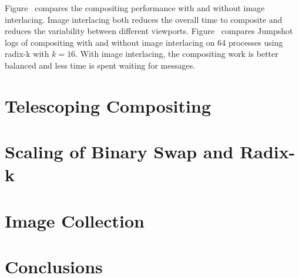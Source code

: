 \documentclass{vgtc}                          %
\begin{document}
Figure~\label{fig:InterlacePerformance} compares the compositing
performance with and without image interlacing.  Image interlacing both
reduces the overall time to composite and reduces the variability between
different viewports.  Figure~\label{fig:InterlaceJumpshot} compares
Jumpshot logs of compositing with and without image interlacing on 64
processes using radix-k with $k = 16$.  With image interlacing, the
compositing work is better balanced and less time is spent waiting for
messages.

\section{Telescoping Compositing}
\label{sec:TelescopingCompositing}

\section{Scaling of Binary Swap and Radix-k}
\label{sec:Scaling}

\section{Image Collection}
\label{sec:ImageCollection}

\section{Conclusions}
\label{sec:Conclusions}




\end{document}
